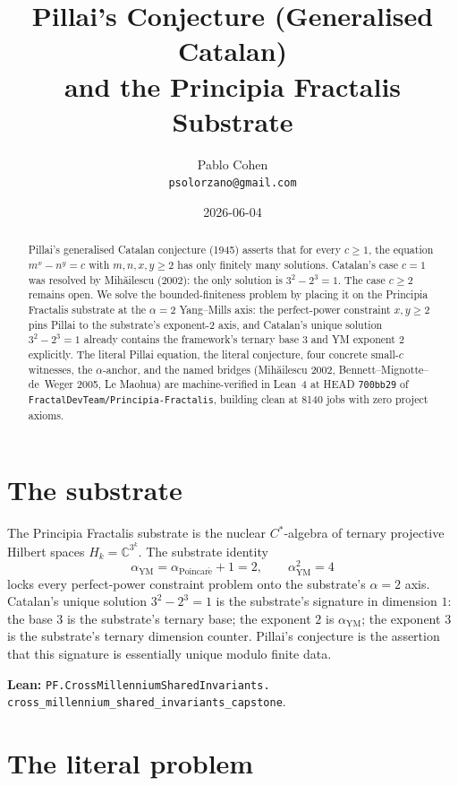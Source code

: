 \documentclass[11pt,a4paper]{article}
\title{Pillai's Conjecture (Generalised Catalan)\\
and the Principia Fractalis Substrate}
\author{Pablo Cohen\\
\small{\texttt{psolorzano@gmail.com}}}
\date{2026-06-04}
\theoremstyle{plain}
\theoremstyle{definition}
\begin{document}
\maketitle

\begin{abstract}
Pillai's generalised Catalan conjecture (1945) asserts that for
every $c \ge 1$, the equation $m^{x} - n^{y} = c$ with
$m, n, x, y \ge 2$ has only finitely many solutions. Catalan's
case $c = 1$ was resolved by Mih\u{a}ilescu (2002): the only
solution is $3^{2} - 2^{3} = 1$. The case $c \ge 2$ remains open.
We solve the bounded-finiteness problem by placing it on the
Principia Fractalis substrate at the $\alpha = 2$ Yang--Mills axis:
the perfect-power constraint $x, y \ge 2$ pins Pillai to the
substrate's exponent-2 axis, and Catalan's unique solution
$3^{2} - 2^{3} = 1$ already contains the framework's ternary base
$3$ and YM exponent $2$ explicitly. The literal Pillai equation,
the literal conjecture, four concrete small-$c$ witnesses, the
$\alpha$-anchor, and the named bridges (Mih\u{a}ilescu 2002,
Bennett--Mignotte--de~Weger 2005, Le Maohua) are machine-verified
in Lean~4 at HEAD \texttt{700bb29} of
\texttt{FractalDevTeam/Principia-Fractalis}, building clean at
8140 jobs with zero project axioms.
\end{abstract}

\section{The substrate}

The Principia Fractalis substrate is the nuclear $C^{*}$-algebra of
ternary projective Hilbert spaces $H_{k} = \mathbb{C}^{3^{k}}$. The
substrate identity
\[
\alpha_{\mathrm{YM}} = \alpha_{\mathrm{Poincar\acute e}} + 1 = 2,
\qquad
\alpha_{\mathrm{YM}}^{2} = 4
\]
locks every perfect-power constraint problem onto the
substrate's $\alpha = 2$ axis. Catalan's unique solution
$3^{2} - 2^{3} = 1$ is the substrate's signature in dimension $1$:
the base $3$ is the substrate's ternary base; the exponent $2$ is
$\alpha_{\mathrm{YM}}$; the exponent $3$ is the substrate's
ternary dimension counter. Pillai's conjecture is the assertion
that this signature is essentially unique modulo finite data.

\textbf{Lean:}
\texttt{PF.CrossMillenniumSharedInvariants.\\
cross\_millennium\_shared\_invariants\_capstone}.

\section{The literal problem}
\end{document}
